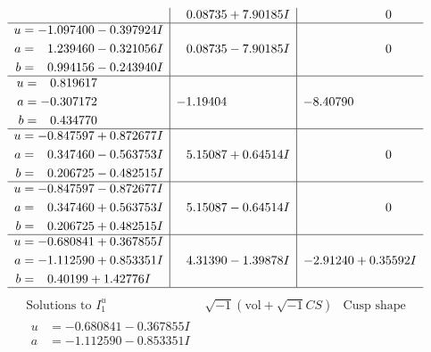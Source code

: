 \documentclass[1p]{elsarticle_modified}
\theoremstyle{definition}
\newcommand{\I}{\sqrt{-1}}
\begin{document}
$$\begin{array}{c|c|c}
 & \phantom{-}0.08735 + 7.90185 I & \phantom{-0.000000 } 0 \\ \hline\begin{aligned}
u &= -1.097400 - 0.397924 I \\
a &= \phantom{-}1.239460 - 0.321056 I \\
b &= \phantom{-}0.994156 - 0.243940 I\end{aligned}
 & \phantom{-}0.08735 - 7.90185 I & \phantom{-0.000000 } 0 \\ \hline\begin{aligned}
u &= \phantom{-}0.819617\phantom{ +0.000000I} \\
a &= -0.307172\phantom{ +0.000000I} \\
b &= \phantom{-}0.434770\phantom{ +0.000000I}\end{aligned}
 & -1.19404\phantom{ +0.000000I} & -8.40790\phantom{ +0.000000I} \\ \hline\begin{aligned}
u &= -0.847597 + 0.872677 I \\
a &= \phantom{-}0.347460 - 0.563753 I \\
b &= \phantom{-}0.206725 - 0.482515 I\end{aligned}
 & \phantom{-}5.15087 + 0.64514 I & \phantom{-0.000000 } 0 \\ \hline\begin{aligned}
u &= -0.847597 - 0.872677 I \\
a &= \phantom{-}0.347460 + 0.563753 I \\
b &= \phantom{-}0.206725 + 0.482515 I\end{aligned}
 & \phantom{-}5.15087 - 0.64514 I & \phantom{-0.000000 } 0 \\ \hline\begin{aligned}
u &= -0.680841 + 0.367855 I \\
a &= -1.112590 + 0.853351 I \\
b &= \phantom{-}0.40199 + 1.42776 I\end{aligned}
 & \phantom{-}4.31390 - 1.39878 I & -2.91240 + 0.35592 I\\
 \hline 
 \end{array}$$\newpage$$\begin{array}{c|c|c}  
\text{Solutions to }I^u_{1}& \I (\text{vol} + \sqrt{-1}CS) & \text{Cusp shape}\\
 \hline 
\begin{aligned}
u &= -0.680841 - 0.367855 I \\
a &= -1.112590 - 0.853351 I \\

\end{aligned}
\end{array}$$
\end{document}
